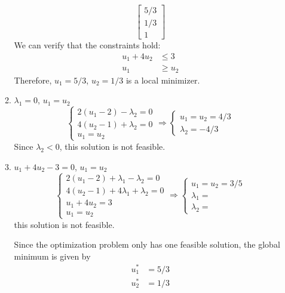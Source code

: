 \documentclass[letterpaper,12pt,titlepage]{article}
\begin{document}
\begin{enumerate}[leftmargin=0pt]
\begin{enumerate}
\[      \begin{bmatrix}
        5/3 \\ 1/3 \\ 1
      \end{bmatrix}
    \]
    We can verify that the constraints hold:
    \begin{align}
      u_1 + 4u_2 &\le 3 \\
      u_1 &\ge u_2
    \end{align}
    Therefore, $u_1=5/3$, $u_2=1/3$ is a local minimizer.
  \item $\lambda_1=0$, $u_1=u_2$
    \[ \begin{cases}
        2(u_1-2) - \lambda_2 = 0 \\
        4(u_2-1) + \lambda_2 = 0 \\
        u_1 = u_2
      \end{cases} \Longrightarrow
      \begin{cases}
        u_1 = u_2 = 4/3 \\
        \lambda_2 = -4/3
      \end{cases}
    \]
    Since $\lambda_2<0$, this solution is not feasible.
  \item $u_1+4u_2-3=0$, $u_1=u_2$
    \[ \begin{cases}
        2(u_1-2) + \lambda_1 - \lambda_2 = 0 \\
        4(u_2-1) + 4\lambda_1 + \lambda_2 = 0 \\
        u_1 + 4u_2 = 3 \\
        u_1 = u_2
      \end{cases} \Longrightarrow
      \begin{cases}
        u_1 = u_2 = 3/5 \\
        \lambda_1 = \\
        \lambda_2 = 
      \end{cases}
    \]
    this solution is not feasible.

    Since the optimization problem only has one feasible solution, the global minimum is given by
    \begin{align}
      u^*_1 &= 5/3 \\
      u^*_2 &= 1/3
    \end{align}
  \end{enumerate}


\end{enumerate}
\end{document}
